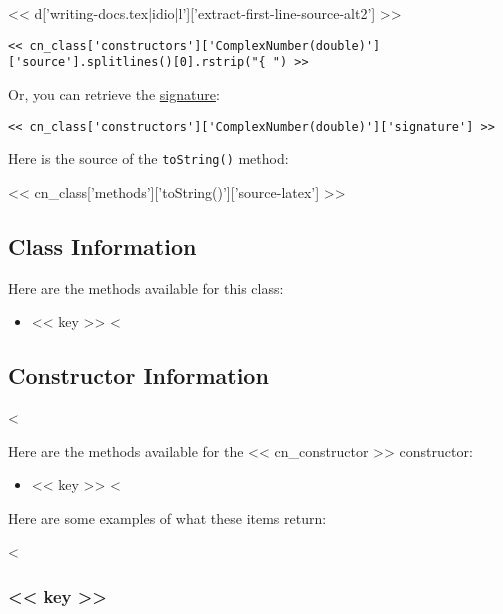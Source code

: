 << d['writing-docs.tex|idio|l']['extract-first-line-source-alt2'] >>

\begin{Verbatim}
<< cn_class['constructors']['ComplexNumber(double)']['source'].splitlines()[0].rstrip("{ ") >>
\end{Verbatim}

Or, you can retrieve the \href{http://download.oracle.com/javase/6/docs/jdk/api/javadoc/doclet/com/sun/javadoc/ExecutableMemberDoc.html#signature()}{signature}:

\begin{Verbatim}
<< cn_class['constructors']['ComplexNumber(double)']['signature'] >>
\end{Verbatim}

Here is the source of the \verb|toString()| method:

<< cn_class['methods']['toString()']['source-latex'] >>

\subsection{Class Information}

Here are the methods available for this class:

\begin{itemize}
<%
\item{<< key >>}
<%
\end{itemize}

\subsection{Constructor Information}

<%

Here are the methods available for the << cn_constructor >> constructor:

\begin{itemize}
<%
\item{<< key >>}
<%
\end{itemize}

Here are some examples of what these items return:

<%
\subsubsection{<< key >>}

